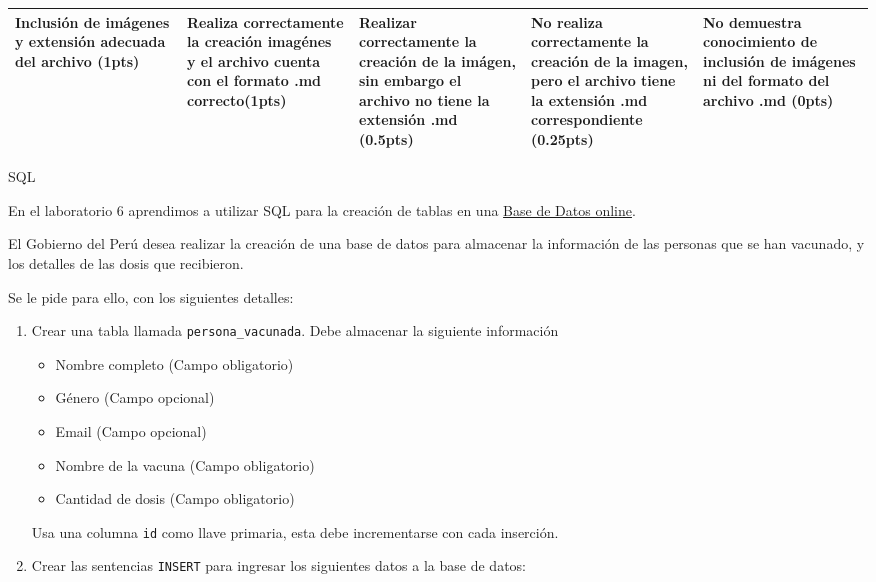 \documentclass[12pt]{exam}
\begin{document}
\begin{questions}
\begin{table}[h]
{\begin{tabular}{|p{0.2\linewidth}|p{0.2\linewidth}|p{0.2\linewidth}|p{0.2\linewidth}|p{0.2\linewidth}|}
    Inclusión de imágenes y extensión adecuada del archivo (1pts) &
    Realiza correctamente la creación imagénes y el archivo cuenta con el formato .md correcto\textbf{(1pts)} &
    Realizar correctamente la creación de la imágen, sin embargo el archivo no tiene la extensión .md \textbf{(0.5pts)} &
    No realiza correctamente la creación de la imagen, pero el archivo tiene la extensión .md correspondiente \textbf{(0.25pts)} &
    No demuestra conocimiento de inclusión de imágenes ni del formato del archivo .md \textbf{(0pts)}\\
    
    \hline

    \end{tabular}
  }
\end{table}

\newpage

\question[5] SQL

En el laboratorio 6 aprendimos a utilizar SQL para la creación de tablas en una \href{https://extendsclass.com/mysql-online.html}{Base de Datos online}.

El Gobierno del Perú desea realizar la creación de una base de datos para almacenar la información de las personas que se han vacunado, y los detalles de las dosis que recibieron.

Se le pide para ello, con los siguientes detalles:

\begin{enumerate}
  \item Crear una tabla llamada \lstinline{persona_vacunada}. Debe almacenar la siguiente información
  
  \begin{itemize}
    \item Nombre completo (Campo obligatorio)
    \item Género (Campo opcional)
    \item Email (Campo opcional)
    \item Nombre de la vacuna (Campo obligatorio)
    \item Cantidad de dosis (Campo obligatorio)
  \end{itemize}

  Usa una columna \lstinline{id} como llave primaria, esta debe incrementarse con cada inserción.

  \item Crear las sentencias \lstinline{INSERT} para ingresar los siguientes datos a la base de datos:
  

\end{enumerate}
\end{questions}
\end{document}
